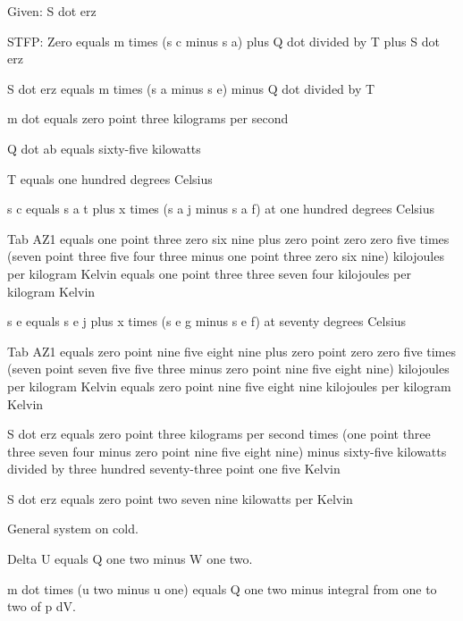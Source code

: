 Given: S dot erz

STFP: Zero equals m times (s c minus s a) plus Q dot divided by T plus S dot erz

S dot erz equals m times (s a minus s e) minus Q dot divided by T

m dot equals zero point three kilograms per second

Q dot ab equals sixty-five kilowatts

T equals one hundred degrees Celsius

s c equals s a t plus x times (s a j minus s a f) at one hundred degrees Celsius

Tab AZ1 equals one point three zero six nine plus zero point zero zero five times (seven point three five four three minus one point three zero six nine) kilojoules per kilogram Kelvin equals one point three three seven four kilojoules per kilogram Kelvin

s e equals s e j plus x times (s e g minus s e f) at seventy degrees Celsius

Tab AZ1 equals zero point nine five eight nine plus zero point zero zero five times (seven point seven five five three minus zero point nine five eight nine) kilojoules per kilogram Kelvin equals zero point nine five eight nine kilojoules per kilogram Kelvin

S dot erz equals zero point three kilograms per second times (one point three three seven four minus zero point nine five eight nine) minus sixty-five kilowatts divided by three hundred seventy-three point one five Kelvin

S dot erz equals zero point two seven nine kilowatts per Kelvin

General system on cold.

Delta U equals Q one two minus W one two.

m dot times (u two minus u one) equals Q one two minus integral from one to two of p dV.